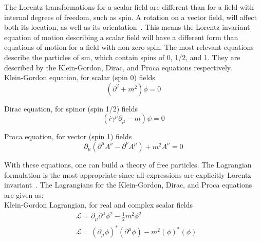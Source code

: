 \par The Lorentz transformations for a scalar field are different than
for a field with internal degrees of freedom, such as spin.  A
rotation on a vector field, will affect both its location, as well as
its orientation~\cite{Peskin_Schroeder}.  This means the Lorentz
invariant equation of motion describing a scalar field will have a
different form than equations of motion for a field with non-zero spin.  The
most relevant equations describe the particles of \acrshort{sm}, which
contain spins of 0, 1/2, and 1.  They are described by the
Klein-Gordon, Dirac, and Proca equations respectively. \\

\noindent Klein-Gordon equation, for scalar (spin 0) fields 
\begin{equation}\label{eq:klein_gordon_eom}
(\partial^{2} + m^{2})\phi = 0  
\end{equation} 

\noindent Dirac equation, for spinor (spin 1/2) fields 
\begin{equation}\label{eq:dirac_eom}
(i\gamma^{\mu}\partial_{\mu} - m)\psi = 0 
\end{equation} 

\noindent Proca equation, for vector (spin 1) fields
\begin{equation}\label{eq:proca_eom}
\partial_{\mu}(\partial^{\mu}A^{\nu} - \partial^{\nu}A^{\mu}) + m^{2}A^{\nu}
= 0 
\end{equation} 

\par With these equations, one can build a theory of free particles.
The Lagrangian formulation is the most appropriate since all
expressions are explicitly Lorentz invariant~\cite{Peskin_Schroeder}.
The Lagrangians for the Klein-Gordon, Dirac, and Proca equations are
given as: \\

\noindent Klein-Gordon Lagrangian, for real and complex scalar fields
\begin{equation}\label{eq:klein_gordon_lagrangian}
\begin{aligned}
& \mathcal{L} = \partial_{\mu}\partial^{\mu}\phi^{2} - \frac{1}{2}m^{2}\phi^{2}  \\
& \mathcal{L} = (\partial_{\mu}\phi)^{\ast}(\partial^{\mu}\phi) - m^{2}(\phi)^{\ast}(\phi) 
\end{aligned}
\end{equation}

